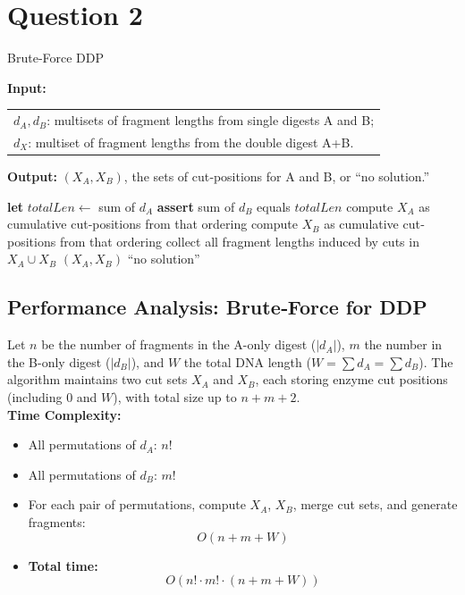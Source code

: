 \documentclass{article}
\begin{document}
\section{Question 2}


\begin{algorithm}[H]
\caption{Brute‑Force DDP}
\label{alg:ddp_bruteforce}
\begin{algorithmic}
  \State \textbf{Input:}
    \begin{tabular}[t]{@{}l@{}}
      $d_A,d_B$: multisets of fragment lengths from single digests A and B;\\
      $d_X$: multiset of fragment lengths from the double digest A+B.
    \end{tabular}
  \State \textbf{Output:} $(X_A,X_B)$, the sets of cut‐positions for A and B, or “no solution.”

    \State \textbf{let} $\mathit{totalLen}\gets$ sum of $d_A$
    \State \textbf{assert} sum of $d_B$ equals $\mathit{totalLen}$
      \State compute $X_A$ as cumulative cut‐positions from that ordering
        \State compute $X_B$ as cumulative cut‐positions from that ordering
        \State collect all fragment lengths induced by cuts in $X_A\cup X_B$
          \State \Return $(X_A,X_B)$
        \EndIf
      \EndFor
    \EndFor
    \State \Return “no solution”
  \EndProcedure
\end{algorithmic}
\end{algorithm}

\subsection*{Performance Analysis: Brute‑Force for DDP}
Let $n$ be the number of fragments in the A-only digest ($|d_A|$), $m$ the number in the B-only digest ($|d_B|$), and $W$ the total DNA length ($W = \sum d_A = \sum d_B$). The algorithm maintains two cut sets $X_A$ and $X_B$, each storing enzyme cut positions (including 0 and $W$), with total size up to $n + m + 2$.\\
\textbf{Time Complexity:}
\begin{itemize}
  \item All permutations of $d_A$: $n!$
  \item All permutations of $d_B$: $m!$
  \item For each pair of permutations, compute $X_A$, $X_B$, merge cut sets, and generate fragments:
  \[
  O(n + m + W)
  \]
  \item \textbf{Total time:} 
  \[
  O(n! \cdot m! \cdot (n + m + W))
  \]
\end{itemize}
\end{document}
